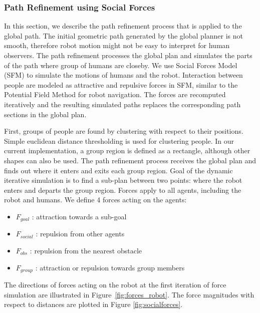 \subsubsection{Path Refinement using Social Forces}
\label{sec:navigation_path_refinement}

In this section, we describe the path refinement process that is applied to the global path. The initial geometric path generated by the global planner is not smooth, therefore robot motion might not be easy to interpret for human observers. The path refinement processes the global plan and simulates the parts of the path where group of humans are closeby. We use Social Forces Model (SFM) \cite{helbing1995social} to simulate the motions of humans and the robot. Interaction between people are modeled as attractive and repulsive forces in SFM, similar to the Potential Field Method \cite{khatib1986real} for robot navigation. The forces are recomputed iteratively and the resulting simulated paths replaces the corresponding path sections in the global plan.

First, groups of people are found by clustering with respect to their positions. Simple euclidean distance thresholding is used for clustering people. In our current implementation, a group region is defined as a rectangle, although other shapes can also be used. The path refinement process receives the global plan and finds out where it enters and exits each group region. Goal of the dynamic iterative simulation is to find a sub-plan between two points: where the robot enters and departs the group region. Forces apply to all agents, including the robot and humans. We define 4 forces acting on the agents:
\begin{itemize}
  \item $F_{goal}$ : attraction towards a sub-goal
  \item $F_{social}$ : repulsion from other agents
  \item $F_{obs}$ : repulsion from the nearest obstacle
  \item $F_{group}$ : attraction or repulsion towards group members
\end{itemize}
The directions of forces acting on the robot at the first iteration of force simulation are illustrated in Figure~\ref{fig:forces_robot}. The force magnitudes with respect to distances are plotted in Figure \ref{fig:socialforces}. 

